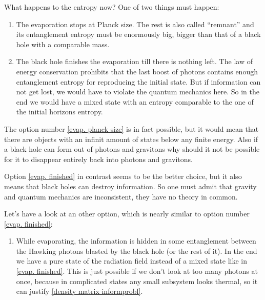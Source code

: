 	What happens to the entropy now? One of two things must happen:
		\begin{enumerate}[(1)]
			\item The evaporation stops at Planck size. The rest is also called ``remnant'' and its entanglement entropy must be enormously big, bigger than that of a black hole with a comparable mass. \label{evap. planck size}
			\item The black hole finishes the evaporation till there is nothing left. The law of energy conservation prohibits that the last boost of photons contains enough entanglement entropy for reproducing the initial state. But if information can not get lost, we would have to violate the quantum mechanics here.
			So in the end we would have a mixed state with an entropy comparable to the one of the initial horizons entropy. \label{evap. finished}
		\end{enumerate}
	The option number \eqref{evap. planck size} is in fact possible, but it would mean that there are objects with an infinit amount of states below any finite energy.
	Also if a black hole can form out of photons and gravitons why should it not be possible for it to disappear entirely back into photons and gravitons.
	
	Option \eqref{evap. finished} in contrast seems to be the better choice, but it also means that black holes can destroy information. So one must admit that gravity and quantum mechanics are inconsistent, they have no theory in common.
	
	Let's have a look at an other option, which is nearly similar to option number \eqref{evap. finished}:
		\begin{enumerate}[(3)]
			\item While evaporating, the information is hidden in some entanglement between the Hawking photons blasted by the black hole (or the rest of it).
			In the end we have a pure state of the radiation field instead of a mixed state like in \eqref{evap. finished}. This is just possible if we don't look at too many photons at once, because in complicated states any small subsystem looks thermal, so it can justify \eqref{density matrix informprobl}. 		
		\end{enumerate}				
		